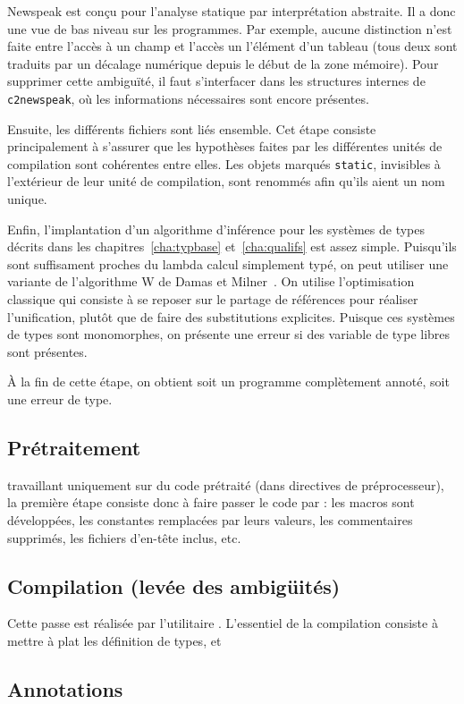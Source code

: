 Newspeak est conçu pour l'analyse statique par interprétation abstraite. Il a
donc une vue de bas niveau sur les programmes. Par exemple, aucune distinction
n'est faite entre l'accès à un champ et l'accès un l'élément d'un tableau (tous
deux sont traduits par un décalage numérique depuis le début de la zone
mémoire). Pour supprimer cette ambiguïté, il faut s'interfacer dans les
structures internes de \texttt{c2newspeak}, où les informations nécessaires sont
encore présentes.

Ensuite, les différents fichiers sont liés ensemble. Cet étape consiste
principalement à s'assurer que les hypothèses faites par les différentes unités
de compilation sont cohérentes entre elles. Les objets marqués \texttt{static},
invisibles à l'extérieur de leur unité de compilation, sont renommés afin qu'ils
aient un nom unique.

Enfin, l'implantation d'un algorithme d'inférence pour les systèmes de types
décrits dans les chapitres~\ref{cha:typbase} et~\ref{cha:qualifs} est assez
simple. Puisqu'ils sont suffisament proches du lambda calcul simplement typé, on
peut utiliser une variante de l'algorithme W de Damas et
Milner~\cite{DamasMilner}. On utilise l'optimisation classique qui consiste à se
reposer sur le partage de références pour réaliser l'unification, plutôt que de
faire des substitutions explicites. Puisque ces systèmes de types sont
monomorphes, on présente une erreur si des variable de type libres sont
présentes.

À la fin de cette étape, on obtient soit un programme complètement annoté, soit
une erreur de type.

\subsection{Prétraitement}

\ctonewspeak{} travaillant uniquement sur du code prétraité (dans directives de
préprocesseur), la première étape consiste donc à faire passer le code par \cpp:
les macros sont développées, les constantes remplacées par leurs valeurs, les
commentaires supprimés, les fichiers d'en-tête inclus, etc.

\subsection{Compilation (levée des ambigüités)}

Cette passe est réalisée par l'utilitaire \ctonewspeak{}. L'essentiel de la
compilation consiste à mettre à plat les définition de types, et \subsection{Annotations}

